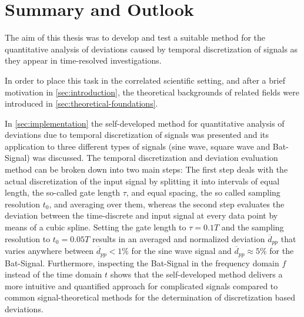 \section{Summary and Outlook} \label{sec:summary-outlook}
The aim of this thesis was to develop and test a suitable method for the quantitative analysis of deviations caused by temporal discretization of signals as they appear in time-resolved investigations.

In order to place this task in the correlated scientific setting, and after a brief motivation in \cref{sec:introduction}, the theoretical backgrounds of related fields were introduced in \cref{sec:theoretical-foundations}.

In \cref{sec:implementation} the self-developed method for quantitative analysis of deviations due to temporal discretization of signals was presented and its application to three different types of signals (sine wave, square wave and Bat-Signal) was discussed. The temporal discretization and deviation evaluation method can be broken down into two main steps: The first step deals with the actual discretization of the input signal by splitting it into intervals of equal length, the so-called gate length $\tau$, and equal spacing, the so called sampling resolution $t_0$, and averaging over them, whereas the second step evaluates the deviation between the time-discrete and input signal at every data point by means of a cubic spline. Setting the gate length to $\tau = 0.1T$ and the sampling resolution to $t_0 = 0.05T$ results in an averaged and normalized deviation $\overline{d}_{pp}$ that varies anywhere between $\overline{d}_{pp} < 1\%$ for the sine wave signal and $\overline{d}_{pp} \approx 5\%$ for the Bat-Signal. Furthermore, inspecting the Bat-Signal in the frequency domain $f$ instead of the time domain $t$ shows that the self-developed method delivers a more intuitive and quantified approach for complicated signals compared to common signal-theoretical methods for the determination of discretization based deviations.

